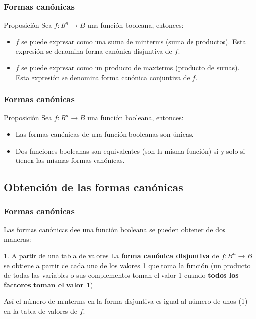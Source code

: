 \documentclass{beamer}
\begin{document}
\begin{frame}
\frametitle{Formas can\'onicas}
\begin{block}{Proposici\'on}
Sea $f:B^n\longrightarrow B$ una funci\'on booleana, entonces:
\begin{itemize}
\item $f$ se puede expresar como una suma de minterms (suma de productos). Esta expresi\'on se denomina forma can\'onica disjuntiva de $f$.
\item $f$ se puede expresar como un producto de maxterms (producto de sumas). Esta expresi\'on se denomina forma can\'onica conjuntiva de $f$.
\end{itemize}
\end{block}
\end{frame}



\begin{frame}
\frametitle{Formas can\'onicas}
\begin{block}{Proposici\'on}
Sea $f:B^n\longrightarrow B$ una funci\'on booleana, entonces:
\begin{itemize}
\item Las formas can\'onicas de una funci\'on booleanas son \'unicas.
\item Dos funciones booleanas son equivalentes (son la misma funci\'on) si y solo si tienen las mismas formas can\'onicas.
\end{itemize}
\end{block}
\end{frame}



\subsection{Obtenci\'on de las formas can\'onicas}
\begin{frame}
\frametitle{Formas can\'onicas}
Las formas can\'onicas dee una funci\'on booleana se pueden obtener de dos maneras:
\begin{block}{1. A partir de una tabla de valores}
La \textbf{forma can\'onica disjuntiva} de $f:B^n\longrightarrow B$ se obtiene a partir de cada uno de los valores 1 que toma la funci\'on (un producto de todas las variables o sus complementos toman el valor 1 cuando \textbf{todos los factores toman el valor 1}).

As\'i el n\'umero de minterms en la forma disjuntiva es igual al n\'umero de unos (1) en la tabla de valores de $f$.
\end{block}
\end{frame}
\end{document}
